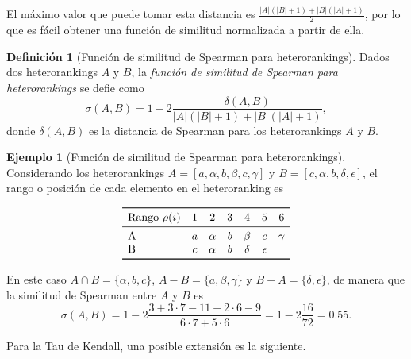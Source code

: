 \documentclass[a4paper,10pt,twoside]{article}
\theoremstyle{definition}
\newtheorem{definition}{Definición}
\newtheorem{example}{Ejemplo}
\begin{document}
El máximo valor que puede tomar esta distancia es $\frac{|A|(|B|+1)+|B|(|A|+1)}{2}$, por lo que es fácil obtener una
función de similitud normalizada a partir de ella.

\begin{definition}[Función de similitud de Spearman para heterorankings]
Dados dos heterorankings $A$ y $B$, la \emph{función de similitud de Spearman para heterorankings} se defie como
\[
\sigma(A,B) = 1-2\frac{\delta(A,B)}{|A|(|B|+1)+|B|(|A|+1)},
\]
donde $\delta(A,B)$ es la distancia de Spearman para los heterorankings $A$ y $B$.
\end{definition}

\begin{example}[Función de similitud de Spearman para heterorankings]
Considerando los heterorankings $A=[a,\alpha,b,\beta,c,\gamma]$ y $B=[c,\alpha,b,\delta,\epsilon]$, el rango o posición de cada elemento en el heteroranking es

\[
\begin{array}{lcccccc}
\toprule
\mbox{Rango $\rho(i)$} & 1 & 2 & 3 & 4 & 5 & 6\\
\midrule
$A$ & a & \alpha & b & \beta & c & \gamma\\
$B$ & c & \alpha & b & \delta & \epsilon\\
\bottomrule
\end{array}
\]

En este caso $A\cap B=\{\alpha, b, c\}$, $A-B=\{a,\beta,\gamma\}$ y $B-A=\{\delta, \epsilon\}$, de manera que la similitud de Spearman entre $A$ y $B$ es
\[
\sigma(A,B) = 1-2\frac{3+3\cdot 7-11+2\cdot 6-9}{6\cdot 7+5\cdot 6}= 1-2\frac{16}{72}= 0.55.
\]
\end{example}

Para la Tau de Kendall, una posible extensión es la siguiente.
\end{document}
